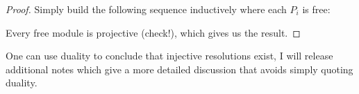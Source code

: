 \documentclass[12pt,reqno]{amsart}
\numberwithin{theorem}{section}
\theoremstyle{definition}
\theoremstyle{remark}
\numberwithin{equation}{section}
\theoremstyle{definition}
\begin{document}
\begin{proof}
    Simply build the following sequence inductively where each $P_i$ is free:
    \begin{center}
    \end{center}
    Every free module is projective (check!), which gives us the result.
\end{proof}
One can use duality to conclude that injective resolutions exist, I will release additional notes which give a more detailed discussion that avoids simply quoting duality.
\end{document}
